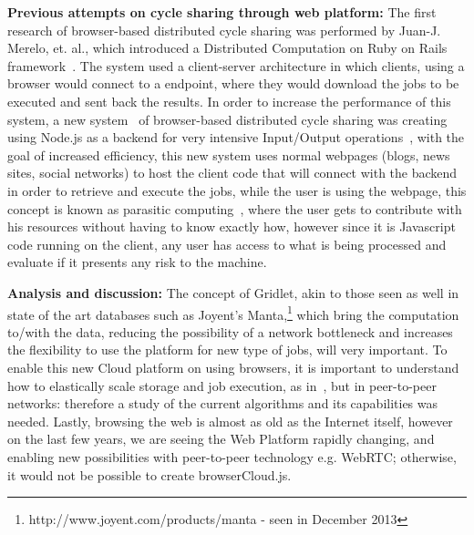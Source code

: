 
\textbf{Previous attempts on cycle sharing through web platform: }
The first research of browser-based distributed cycle sharing was performed by Juan-J. Merelo, et. al., which introduced a Distributed Computation on Ruby on Rails framework~\cite{Merelo2007}. The system used a client-server architecture in which clients, using a browser would connect to a endpoint, where they would download the jobs to be executed and sent back the results. In order to increase the performance of this system, a new system~\cite{Duda2013} of browser-based distributed cycle sharing was creating using Node.js as a backend for very intensive Input/Output operations~\cite{Tilkov2010}, with the goal of increased efficiency, this new system uses normal webpages (blogs, news sites, social networks) to host the client code that will connect with the backend in order to retrieve and execute the jobs, while the user is using the webpage, this concept is known as parasitic computing~\cite{Barabasi2001}, where the user gets to contribute with his resources without having to know exactly how, however since it is Javascript code running on the client, any user has access to what is being processed and evaluate if it presents any risk to the machine.


\textbf{Analysis and discussion: }
%
The concept of Gridlet, akin to those seen as well in state of the art databases such as Joyent's Manta,\footnote{http://www.joyent.com/products/manta - seen in December 2013} which bring the computation to/with the data, reducing the possibility of a network bottleneck and increases the flexibility to use the platform for new type of jobs, will very important. To enable this new Cloud platform on using browsers, it is important to understand how to elastically scale storage and job execution, as in~\cite{Silva2011}, but in peer-to-peer networks: therefore a study of the current algorithms and its capabilities was needed. Lastly, browsing the web is almost as old as the Internet itself, however on the last few years, we are seeing the Web Platform rapidly changing, and enabling new possibilities with peer-to-peer technology e.g. WebRTC; otherwise, it would not be possible to create browserCloud.js. 
